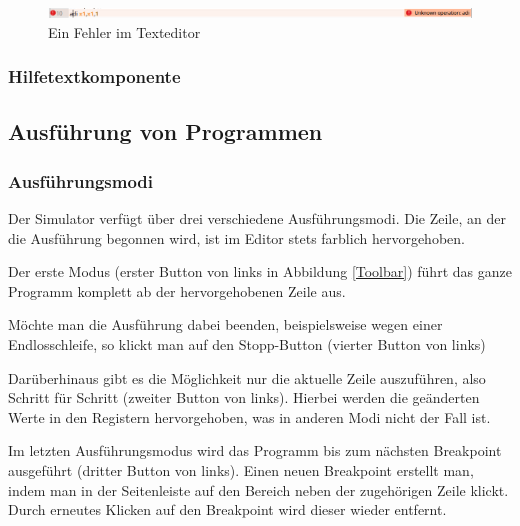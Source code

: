 \begin{figure}[ht]
	\centering
  \includegraphics[width=\textwidth]{Images/Editor_error}
	\caption{Ein Fehler im Texteditor}
	\label{Editor_Error}
\end{figure}


\subsubsection{Hilfetextkomponente}
\label{help-component}


\subsection{Ausführung von Programmen}

\subsubsection{Ausführungsmodi}

Der Simulator verfügt über drei verschiedene Ausführungsmodi. Die Zeile, an der die Ausführung begonnen wird, ist im Editor stets farblich hervorgehoben.

Der erste Modus (erster Button von links in Abbildung \ref{Toolbar}) führt das ganze Programm komplett ab der hervorgehobenen Zeile aus.

Möchte man die Ausführung dabei beenden, beispielsweise wegen einer Endlosschleife, so klickt man auf den Stopp-Button (vierter Button von links)

Darüberhinaus gibt es die Möglichkeit nur die aktuelle Zeile auszuführen, also Schritt für Schritt (zweiter Button von links). Hierbei werden die geänderten Werte in den Registern hervorgehoben, was in anderen Modi nicht der Fall ist.

Im letzten Ausführungsmodus wird das Programm bis zum nächsten Breakpoint ausgeführt (dritter Button von links). Einen neuen Breakpoint erstellt man, indem man in der Seitenleiste auf den Bereich neben der zugehörigen Zeile klickt. Durch erneutes Klicken auf den Breakpoint wird dieser wieder entfernt.


